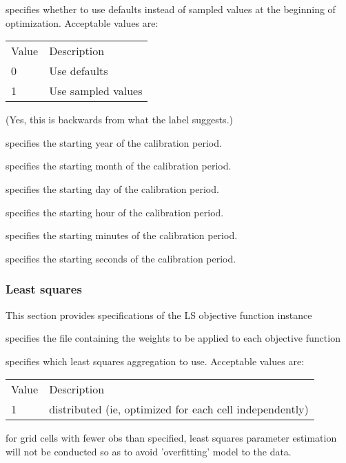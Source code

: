   specifies
 whether to use defaults instead of sampled values at the beginning
 of optimization.
 Acceptable values are:

 \begin{tabular}{ll}
 Value & Description        \\
 0     & Use defaults       \\
 1     & Use sampled values \\
 \end{tabular}
 \newline (Yes, this is backwards from what the label suggests.)

  specifies the starting year
 of the calibration period.

  specifies the starting
 month of the calibration period.

  specifies the starting day
 of the calibration period.

  specifies the starting hour
 of the calibration period.

  specifies the starting
 minutes of the calibration period.

  specifies the starting
 seconds of the calibration period.
 

 
 \subsubsection{Least squares} \label{ssec:ls}
 This section provides specifications of the LS objective function instance
 

 
  specifies the file containing
 the weights to be applied to each objective function

  specifies which 
 least squares aggregation to use.
 Acceptable values are:

 \begin{tabular}{ll}
 Value & Description    \\
 1     & distributed (ie, optimized for each cell independently)  \\
 \end{tabular}

  for
 grid cells with fewer obs than specified, least squares parameter
 estimation will not be conducted so as to avoid 'overfitting' model to the data.
 

